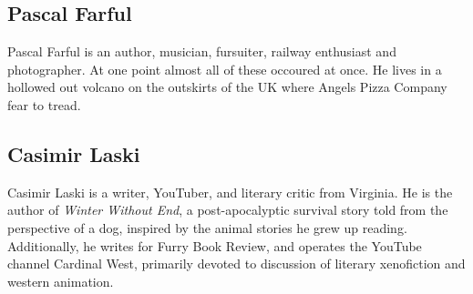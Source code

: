 \subsection*{Pascal Farful}
Pascal Farful is an author, musician, fursuiter, railway enthusiast and photographer. At one point almost all of these occoured at once. He lives in a hollowed out volcano on the outskirts of the UK where Angels Pizza Company fear to tread.

\subsection*{Casimir Laski}
Casimir Laski is a writer, YouTuber, and literary critic from Virginia. He is the author of \emph{Winter Without End}, a post-apocalyptic survival story told from the perspective of a dog, inspired by the animal stories he grew up reading. Additionally, he writes for Furry Book Review, and operates the YouTube channel Cardinal West, primarily devoted to discussion of literary xenofiction and western animation.
